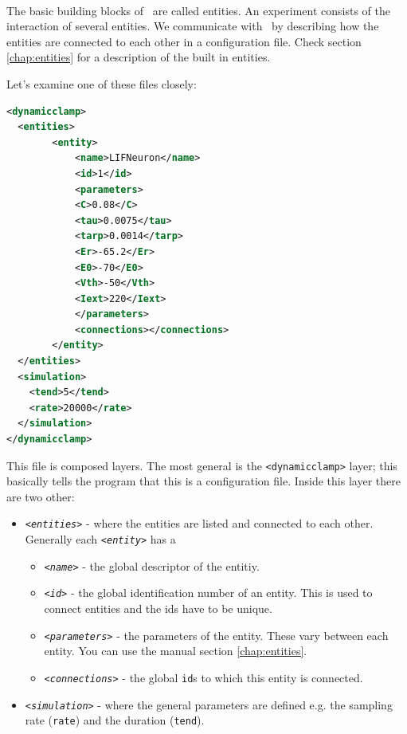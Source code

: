 \paragraph{}
The basic building blocks of \progname\ are called entities. An
experiment consists of the interaction of several entities. We
communicate with \progname\ by describing how the entities are
connected to each other in a configuration file. Check section
\ref{chap:entities} for a description of the built in entities.

Let's examine one of these files closely:

\renewcommand{\lstlistingname}{Example}
\begin{lstlisting}[caption={A simple example of a configuration file
    with a simulated integrate and fire
    neuron.},label={gettingStarted:example0},language=XML,morekeywords={dynamic
    clamp,entities,entity,name,id,C,tau,tarp,Er,E0,Vth,Iext,parameters,connections,simulation,tend,rate}]
<dynamicclamp>
  <entities>
    	<entity>
      		<name>LIFNeuron</name>
      		<id>1</id>
      		<parameters>
			<C>0.08</C>
			<tau>0.0075</tau>
			<tarp>0.0014</tarp>
			<Er>-65.2</Er>
			<E0>-70</E0>
			<Vth>-50</Vth>
			<Iext>220</Iext>
      		</parameters>
      		<connections></connections>
    	</entity>
  </entities>
  <simulation>
  	<tend>5</tend>
   	<rate>20000</rate>
  </simulation>
</dynamicclamp>
\end{lstlisting}
 
This file is composed layers. The most general is the
\texttt{<dynamicclamp>} layer; this basically tells the program that
this is a configuration file. Inside this layer there are two other:
\begin{itemize}
\item
\emph{ \texttt{<entities>}}  - where the entities are listed and
connected to each other. Generally each \emph{\texttt{<entity>}} has a
\begin{itemize}
\item \emph{ \texttt{<name>}} - the global descriptor of the entitiy. 
\item \emph{ \texttt{<id>}} - the global identification number of an
  entity. This is used to connect entities and the ids have to be
  unique.
\item \emph{ \texttt{<parameters>}} - the parameters of the
  entity. These vary between each entity. You can use the manual
  section \ref{chap:entities}.
\item \emph{ \texttt{<connections>}} - the global \texttt{id}s to
  which this entity is connected.
\end{itemize}
\item
\emph{ \texttt{<simulation>}} - where the general parameters are
defined e.g. the sampling rate (\texttt{rate}) and the duration
(\texttt{tend}).
\end{itemize}

